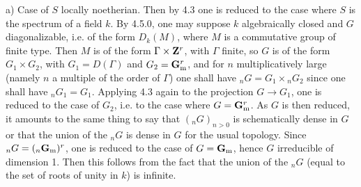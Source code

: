 a) Case of $S$ locally noetherian. Then by 4.3 one is reduced to the case where $S$ is the spectrum of a field $k$. By 4.5.0, one may suppose $k$ algebraically closed and $G$ diagonalizable, i.e. of the form $D_k(M)$, where $M$ is a commutative group of finite type. Then $M$ is of the form $\Gamma\times\mathbf{Z}^r$, with $\Gamma$ finite, so $G$ is of the form $G_1\times G_2$, with $G_1=D(\Gamma)$ and $G_2=\mathbf{G}_{\mathrm{m}}^r$, and for $n$ multiplicatively large (namely $n$ a multiple of the order of $\Gamma$) one shall have ${}_nG=G_1\times{}_nG_2$ since one shall have ${}_nG_1=G_1$.
Applying 4.3 again to the projection $G\to G_1$, one is reduced to the case of $G_2$, i.e. to the case where $G=\mathbf{G}_{\mathrm{m}}^r$. As $G$ is then reduced, it amounts to the same thing to say that $({}_nG)_{n>0}$ is schematically dense in $G$ or that the union of the ${}_nG$ is dense in $G$ for the usual topology. Since ${}_nG=({}_n\mathbf{G}_{\mathrm{m}})^r$, one is reduced to the case of $G=\mathbf{G}_{\mathrm{m}}$, hence $G$ irreducible of dimension 1. Then this follows from the fact that the union of the ${}_nG$ (equal to the set of roots of unity in $k$) is infinite.

